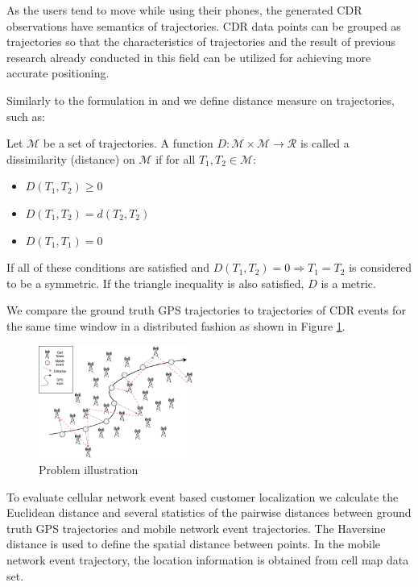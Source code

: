 As the users tend to move while using their phones, the generated CDR observations have semantics of trajectories. CDR data points can be grouped as trajectories so that the characteristics of trajectories and the result of previous research already conducted in this field can be utilized for achieving more accurate positioning.

Similarly to the formulation in \cite{encyclopedia} and \cite{distance-def} we define distance measure on trajectories, such as:
\begin{definition}
Let $\mathcal{M}$ be a set of trajectories. A function $D :\mathcal{M} \times \mathcal{M} \rightarrow \mathcal{R}$  is called a dissimilarity (distance) on $\mathcal{M}$ if for all $T_{1}, T_{2} \in \mathcal{M}$: 
\begin{itemize}
    \item $D(T_{1},T_{2}) \geqslant 0$
    \item $D(T_{1},T_{2}) = d(T_{2},T_{2})$
    \item $D(T_{1},T_{1}) = 0$
\end{itemize}
If all of these conditions are satisfied and $D(T_{1}, T_{2}) = 0 \Rightarrow  T_{1} = T_{2} $ is considered to be a symmetric. If
the triangle inequality is also satisfied, $D$ is a metric.
\end{definition}

We compare the ground truth GPS trajectories to trajectories of CDR events for the same time window in a distributed fashion as shown in Figure \ref{fig:problem}. 
\begin{figure}[h]
    \centering
    \includegraphics[width=0.45\textwidth]{images/problem.png}
    \caption{Problem illustration}
    \label{fig:problem}
\end{figure}

To evaluate cellular network event based customer localization we calculate the Euclidean distance and several statistics of the pairwise distances between ground truth GPS trajectories and mobile network event trajectories. The Haversine distance is used to define the spatial distance between points. In the mobile network event trajectory, the location information is obtained from cell map data set.

